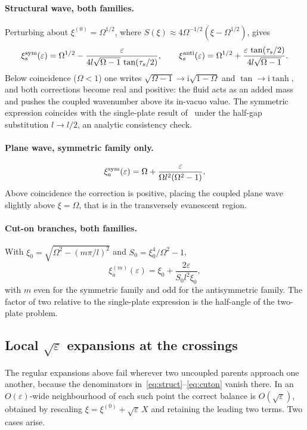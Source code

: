 \documentclass[11pt,a4paper]{article}
\newcommand{\Om}{\Omega}
\newcommand{\eps}{\varepsilon}
\newcommand{\ii}{\mathrm{i}}
\theoremstyle{plain}
\theoremstyle{remark}
\begin{document}
\paragraph{Structural wave, both families.} Perturbing about $\xi^{(0)}=\Om^{1/2}$, where
$S(\xi)\approx4\Om^{-1/2}(\xi-\Om^{1/2})$, gives
\begin{equation}
\xi_s^{\rm sym}(\eps)=\Om^{1/2}-\frac{\eps}{4l\sqrt{\Om-1}\,\tan(\tau_s/2)},
\qquad
\xi_s^{\rm anti}(\eps)=\Om^{1/2}+\frac{\eps\,\tan(\tau_s/2)}{4l\sqrt{\Om-1}} .
\label{eq:struct}
\end{equation}
Below coincidence ($\Om<1$) one writes $\sqrt{\Om-1}\to\ii\sqrt{1-\Om}$ and $\tan\to\ii\tanh$, and both
corrections become real and positive: the fluid acts as an added mass and pushes the coupled
wavenumber above its in-vacuo value. The symmetric expression coincides with the single-plate result
of~\cite{sarkarsonti} under the half-gap substitution $l\to l/2$, an analytic consistency check.

\paragraph{Plane wave, symmetric family only.}
\begin{equation}
\xi_a^{\rm sym}(\eps)=\Om+\frac{\eps}{\Om l^2(\Om^2-1)} .
\label{eq:planewave}
\end{equation}
Above coincidence the correction is positive, placing the coupled plane wave slightly above $\xi=\Om$,
that is in the transversely evanescent region.

\paragraph{Cut-on branches, both families.} With
$\xi_0=\sqrt{\Om^2-(m\pi/l)^2}$ and $S_0=\xi_0^4/\Om^2-1$,
\begin{equation}
\xi_a^{(m)}(\eps)=\xi_0+\frac{2\eps}{S_0l^2\xi_0},
\label{eq:cuton}
\end{equation}
with $m$ even for the symmetric family and odd for the antisymmetric family. The factor of two relative
to the single-plate expression is the half-angle of the two-plate problem.

\subsection{Local $\sqrt\eps$ expansions at the crossings}
The regular expansions above fail wherever two uncoupled parents approach one another, because the
denominators in~\eqref{eq:struct}--\eqref{eq:cuton} vanish there. In an $O(\eps)$-wide neighbourhood of
each such point the correct balance is $O(\sqrt\eps)$, obtained by rescaling
$\xi=\xi^{(0)}+\sqrt\eps\,X$ and retaining the leading two terms. Two cases arise.
\end{document}
